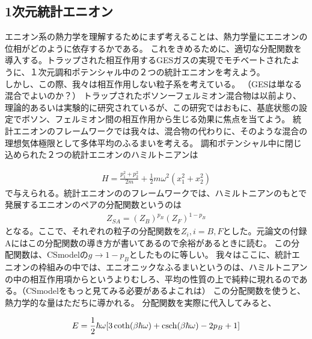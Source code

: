 \documentclass[a4paper,11pt]{jsarticle}
\begin{document}
\subsection{1次元統計エニオン}
エニオン系の熱力学を理解するためにまず考えることは、熱力学量にエニオンの位相がどのように依存するかである。
これをきめるために、適切な分配関数を導入する。トラップされた相互作用するGESガスの実現でモチベートされたように、１次元調和ポテンシャル中の２つの統計エニオンを考えよう。\\
しかし、この際、我々は相互作用しない粒子系を考えている。
（GESは単なる混合でよいのか？）
トラップされたボソンーフェルミオン混合物は以前より、理論的あるいは実験的に研究されているが、この研究ではおもに、基底状態の設定でボソン、フェルミオン間の相互作用から生じる効果に焦点を当てよう。
統計エニオンのフレームワークでは我々は、混合物の代わりに、そのような混合の理想気体極限として多体平均のふるまいを考える。
調和ポテンシャル中に閉じ込められた２つの統計エニオンのハミルトニアンは

\begin{align}
H=\frac{p_1^2+p_2^2}{2m}+\frac{1}{2}m\omega^2(x_1^2+x_2^2)
\end{align}
で与えられる。統計エニオンののフレームワークでは、ハミルトニアンのもとで発展するエニオンのペアの分配関数というのは
\begin{align}
Z_{SA}=(Z_B)^{p_B}(Z_F)^{1-p_B}
\end{align}
となる。ここで、それぞれの粒子の分配関数を$Z_i,i=B,F$とした。元論文の付録Aにはこの分配関数の導き方が書いてあるので余裕があるときに読む。
この分配関数は、CSmodelの$g\rightarrow1-p_B$としたものに等しい。
我々はここに、統計エニオンの枠組みの中では、エニオニックなふるまいというのは、ハミルトニアンの中の相互作用項からというよりむしろ、平均の性質の上で純粋に現れるのである。（CSmodelをもっと見てみる必要があるよこれは）
この分配関数を使うと、熱力学的な量はただちに導かれる。
分配関数を実際に代入してみると、

\begin{align}
E=\frac{1}{2}\hbar \omega[3\coth (\beta\hbar\omega)+\csch(\beta\hbar\omega)-2p_B+1 ]
\end{align}
\end{document}
